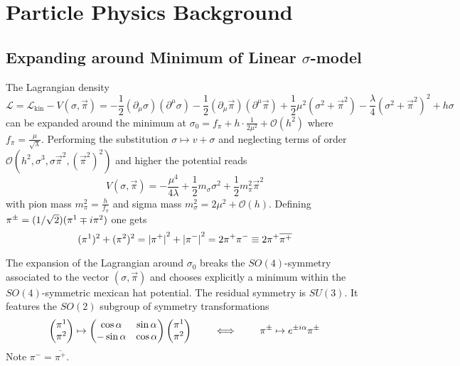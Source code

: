 \chapter{Particle Physics Background}

\section{Expanding around Minimum of Linear $\sigma$-model}

The Lagrangian density
\begin{equation}
    \mathscr{L}=\mathcal{L}_{\text{kin}}-V(\sigma,\vec{\pi})=-\frac{1}{2}(\partial_\mu\sigma)(\partial^\mu\sigma)-\frac{1}{2}(\partial_\mu\vec{\pi})(\partial^\mu\vec{\pi})+\frac{1}{2}\mu^2(\sigma^2+\vec{\pi}^2)-\frac{\lambda}{4}(\sigma^2+\vec{\pi}^2)^2+h\sigma
    \label{eq:LinearSigmaModelLagrangian}
\end{equation}
can be expanded around the minimum at $\sigma_0=f_\pi+h\cdot\frac{1}{2\mu^2}+\mathcal{O}(h^2)$ where $f_\pi=\frac{\mu}{\sqrt{\lambda}}$. Performing the substitution $\sigma\mapsto v+\sigma$ and neglecting terms of order $\mathcal{O}(h^2,\sigma^3,\sigma\vec{\pi}^2,(\vec{\pi}^2)^2)$ and higher the potential reads
\begin{equation}
    V(\sigma,\vec{\pi})=-\frac{\mu^4}{4\lambda}+\frac{1}{2}m_\sigma\sigma^2+\frac{1}{2}m_\pi^2\vec{\pi}^2
\end{equation}
with pion mass $m_\pi^2=\frac{h}{f_\pi}$ and sigma mass $m_\sigma^2=2\mu^2+\mathcal{O}(h)$. Defining $\pi^\pm=(1/\sqrt{2})(\pi^1\mp{i}\pi^2)$ one gets 
\begin{equation}
    (\pi^1)^2+(\pi^2)^2={\vert\pi^+\vert}^2+{\vert\pi^-\vert}^2=2\pi^+\pi^-\equiv 2\pi^+\overline{\pi^+}
\end{equation}

The expansion of the Lagrangian around $\sigma_0$ breaks the $SO(4)$-symmetry associated to the vector $(\sigma,\vec{\pi})$ and chooses explicitly a minimum within the $SO(4)$-symmetric mexican hat potential. The residual symmetry is $SU(3)$. It features the $SO(2)$ subgroup of symmetry transformations
\begin{equation}
    \begin{pmatrix}
        \pi^1\\\pi^2
    \end{pmatrix}
        \mapsto
        \begin{pmatrix}
            \cos\alpha&\sin\alpha\\-\sin\alpha&\cos\alpha
        \end{pmatrix}
        \begin{pmatrix}
            \pi^1\\\pi^2
        \end{pmatrix}
        \qquad\iff\qquad\pi^\pm\mapsto e^{\pm{i}\alpha}\pi^\pm
\end{equation}
Note $\pi^-=\overline{\pi^+}$.

